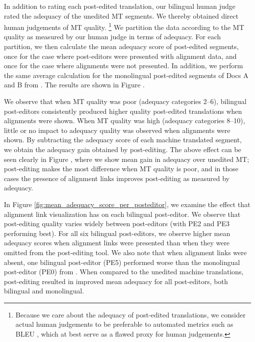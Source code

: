 In addition to rating each post-edited translation, our bilingual human judge rated the adequacy of the unedited MT segments.
%
We thereby obtained direct human judgements of MT quality.%
%
\footnote{Because we care about the adequacy of post-edited translations, we consider actual human judgements to be preferable to automated metrics such as BLEU \citep{2002_ACL_Papineni_etal}, which at best serve as a flawed proxy for human judgements.}
%
We partition the data according to the MT quality as measured by our human judge in terms of adequacy.
%
For each partition, we then calculate the mean adequacy score of post-edited segments, once for the case where post-editors were presented with alignment data, and once for the case where alignments were not presented.
%
In addition, we perform the same average calculation for the monolingual post-edited segments of Docs A and B from \citet{2014_WMT_Schwartz_etal}.
%
The results are shown in Figure .









We observe that when MT quality was poor (adequacy categories 2--6), bilingual post-editors consistently produced higher quality post-edited translations when alignments were shown.
%
When MT quality was high (adequacy categories 8--10), little or no impact to adequacy quality was observed when alignments were shown. 
%
By subtracting the adequacy score of each machine translated segment, we obtain the adequacy gain obtained by post-editing.
%
The above effect can be seen clearly in Figure , where we show mean gain in adequacy over unedited MT;
%
post-editing makes the most difference when MT quality is poor, and in those cases the presence of alignment links improves post-editing as measured by adequacy.


In Figure \ref{fig:mean_adequacy_score_per_posteditor}, we examine the effect that alignment link visualization has on each bilingual post-editor.
%
We observe that post-editing quality varies widely between post-editors (with PE2 and PE3 performing best).
%
For all six bilingual post-editors, we observe higher mean adequacy scores when alignment links were presented than when they were omitted from the post-editing tool.
%
We also note that when alignment links were absent, one bilingual post-editor (PE5) performed worse than the monolingual post-editor (PE0) from \citet{2014_WMT_Schwartz_etal}.
%
When compared to the unedited machine translations, post-editing resulted in improved mean adequacy for all post-editors, both bilingual and monolingual.

